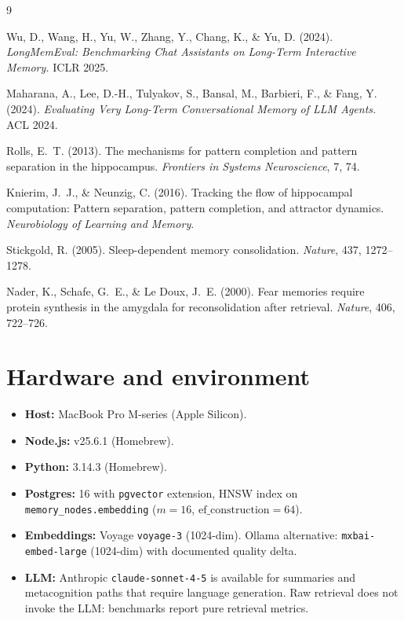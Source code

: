 \documentclass{article}
\begin{document}
\begin{thebibliography}{9}

Wu, D., Wang, H., Yu, W., Zhang, Y., Chang, K., \& Yu, D. (2024).
\newblock \emph{LongMemEval: Benchmarking Chat Assistants on Long-Term
Interactive Memory.}
\newblock ICLR 2025.

Maharana, A., Lee, D.-H., Tulyakov, S., Bansal, M., Barbieri, F., \&
Fang, Y. (2024).
\newblock \emph{Evaluating Very Long-Term Conversational Memory of LLM
Agents.}
\newblock ACL 2024.

Rolls, E.~T. (2013).
\newblock The mechanisms for pattern completion and pattern separation
in the hippocampus.
\newblock \emph{Frontiers in Systems Neuroscience}, 7, 74.

Knierim, J.~J., \& Neunzig, C. (2016).
\newblock Tracking the flow of hippocampal computation: Pattern
separation, pattern completion, and attractor dynamics.
\newblock \emph{Neurobiology of Learning and Memory}.

Stickgold, R. (2005).
\newblock Sleep-dependent memory consolidation.
\newblock \emph{Nature}, 437, 1272--1278.

Nader, K., Schafe, G.~E., \& Le Doux, J.~E. (2000).
\newblock Fear memories require protein synthesis in the amygdala for
reconsolidation after retrieval.
\newblock \emph{Nature}, 406, 722--726.

\end{thebibliography}

\appendix

\section{Hardware and environment}

\begin{itemize}
  \item \textbf{Host:} MacBook Pro M-series (Apple Silicon).
  \item \textbf{Node.js:} v25.6.1 (Homebrew).
  \item \textbf{Python:} 3.14.3 (Homebrew).
  \item \textbf{Postgres:} 16 with \texttt{pgvector} extension, HNSW
        index on \texttt{memory\_nodes.embedding}
        ($m = 16$, $\text{ef\_construction} = 64$).
  \item \textbf{Embeddings:} Voyage \texttt{voyage-3} (1024-dim). Ollama
        alternative: \texttt{mxbai-embed-large} (1024-dim) with
        documented quality delta.
  \item \textbf{LLM:} Anthropic \texttt{claude-sonnet-4-5} is available
        for summaries and metacognition paths that require language
        generation. Raw retrieval does not invoke the LLM: benchmarks
        report pure retrieval metrics.
\end{itemize}
\end{document}
